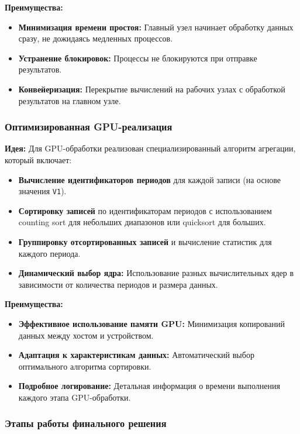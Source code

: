 \documentclass[areaset=advanced]{scrartcl}
\begin{document}
\textbf{Преимущества:}
\begin{itemize}
    \item \textbf{Минимизация времени простоя:} Главный узел начинает обработку данных сразу, не дожидаясь медленных процессов.
    \item \textbf{Устранение блокировок:} Процессы не блокируются при отправке результатов.
    \item \textbf{Конвейеризация:} Перекрытие вычислений на рабочих узлах с обработкой результатов на главном узле.
\end{itemize}

\subsubsection{Оптимизированная GPU-реализация}

\textbf{Идея:} Для GPU-обработки реализован специализированный алгоритм агрегации, который включает:
\begin{itemize}
    \item \textbf{Вычисление идентификаторов периодов} для каждой записи (на основе значения \texttt{V1}).
    \item \textbf{Сортировку записей} по идентификаторам периодов с использованием counting sort для небольших диапазонов или quicksort для больших.
    \item \textbf{Группировку отсортированных записей} и вычисление статистик для каждого периода.
    \item \textbf{Динамический выбор ядра:} Использование разных вычислительных ядер в зависимости от количества периодов и размера данных.
\end{itemize}

\textbf{Преимущества:}
\begin{itemize}
    \item \textbf{Эффективное использование памяти GPU:} Минимизация копирований данных между хостом и устройством.
    \item \textbf{Адаптация к характеристикам данных:} Автоматический выбор оптимального алгоритма сортировки.
    \item \textbf{Подробное логирование:} Детальная информация о времени выполнения каждого этапа GPU-обработки.
\end{itemize}

\subsubsection{Этапы работы финального решения}
\end{document}
